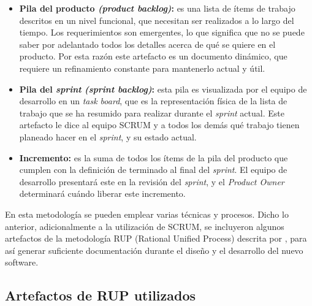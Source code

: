 			\begin{itemize}
				\item \textbf{Pila del producto \textit{(product backlog)}: }
					es una lista de \'{i}tems de trabajo descritos en un nivel funcional, que necesitan ser realizados a lo largo del tiempo. Los requerimientos son emergentes, lo que significa que no se puede saber por adelantado todos los detalles acerca de qu\'{e} se quiere en el producto. Por esta raz\'{o}n este artefacto es un documento din\'{a}mico, que requiere un refinamiento constante para mantenerlo actual y \'{u}til.
				
				\item \textbf{Pila del \textit{sprint} \textit{(sprint backlog)}: }
				esta pila es visualizada por el equipo de desarrollo en un \textit{task board}, que es la representaci\'{o}n f\'{i}sica de la lista de trabajo que se ha resumido para realizar durante el \textit{sprint} actual. Este artefacto le dice al equipo SCRUM y a todos los dem\'{a}s qu\'{e} trabajo tienen planeado hacer en el \textit{sprint}, y su estado actual.
				
				\item \textbf{Incremento: }
				es la suma de todos los \'{i}tems de la pila del producto que cumplen con la definici\'{o}n de terminado al final del \textit{sprint}. El equipo de desarrollo presentar\'{a} este en la revisi\'{o}n del \textit{sprint}, y el \textit{Product Owner} determinar\'{a} cu\'{a}ndo liberar este incremento.
				
			\end{itemize}
			
En esta metodolog\'{i}a se pueden emplear varias t\'{e}cnicas y procesos. Dicho lo anterior, adicionalmente a la utilizaci\'{o}n de SCRUM, se incluyeron algunos artefactos de la metodolog\'{i}a RUP (Rational Unified Process) descrita por \cite{Kroll&Kruchten}, para as\'{i} generar suficiente documentaci\'{o}n durante el dise\~{n}o y el desarrollo del nuevo software. 

	\subsection{Artefactos de RUP utilizados}
	
